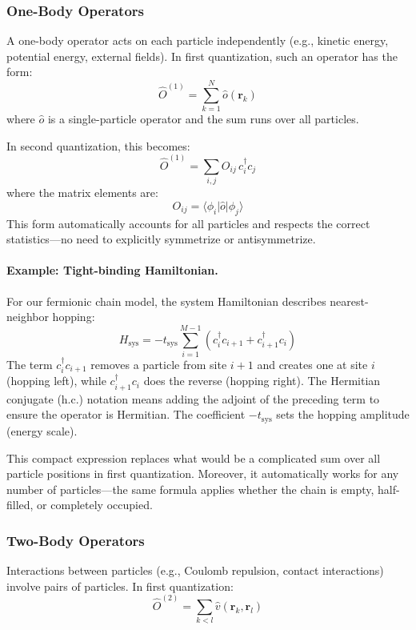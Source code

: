 \documentclass[12pt,oneside,openright]{report}
\theoremstyle{definition}
\theoremstyle{plain}
\theoremstyle{remark}
\begin{document}
\subsubsection{One-Body Operators}
A one-body operator acts on each particle independently (e.g., kinetic energy, potential energy, 
external fields). In first quantization, such an operator has the form:
\begin{equation}
\hat{O}^{(1)} = \sum_{k=1}^N \hat{o}(\mathbf{r}_k)
\end{equation}
where $\hat{o}$ is a single-particle operator and the sum runs over all particles.

In second quantization, this becomes:
\begin{equation}
\hat{O}^{(1)} = \sum_{i,j} O_{ij} \, c_i^\dagger c_j
\label{eq:one_body_op_general}
\end{equation}
where the matrix elements are:
\begin{equation}
O_{ij} = \langle \phi_i | \hat{o} | \phi_j \rangle
\end{equation}
This form automatically accounts for all particles and respects the correct statistics—no need 
to explicitly symmetrize or antisymmetrize.

\paragraph{Example: Tight-binding Hamiltonian.}
For our fermionic chain model, the system Hamiltonian describes nearest-neighbor hopping:
\begin{equation}
H_{\mathrm{sys}} = -t_{\mathrm{sys}} \sum_{i=1}^{M-1} \left( c_i^\dagger c_{i+1} + c_{i+1}^\dagger c_i \right)
\end{equation}
The term $c_i^\dagger c_{i+1}$ removes a particle from site $i+1$ and creates one at site $i$ 
(hopping left), while $c_{i+1}^\dagger c_i$ does the reverse (hopping right). The Hermitian 
conjugate (h.c.) notation means adding the adjoint of the preceding term to ensure the operator 
is Hermitian. The coefficient $-t_{\mathrm{sys}}$ sets the hopping amplitude (energy scale).

This compact expression replaces what would be a complicated sum over all particle positions 
in first quantization. Moreover, it automatically works for any number of particles—the same 
formula applies whether the chain is empty, half-filled, or completely occupied.

\subsubsection{Two-Body Operators}
Interactions between particles (e.g., Coulomb repulsion, contact interactions) involve pairs 
of particles. In first quantization:
\begin{equation}
\hat{O}^{(2)} = \sum_{k<l} \hat{v}(\mathbf{r}_k, \mathbf{r}_l)
\end{equation}
\end{document}
